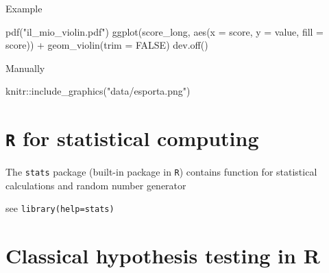 \documentclass[
  ignorenonframetext,
]{beamer}
\newenvironment{Shaded}{\begin{snugshade}}{\end{snugshade}}
\newcommand{\AttributeTok}[1]{\textcolor[rgb]{0.00,0.34,0.68}{#1}}
\newcommand{\ConstantTok}[1]{\textcolor[rgb]{0.67,0.33,0.00}{#1}}
\newcommand{\FunctionTok}[1]{\textcolor[rgb]{0.39,0.29,0.61}{#1}}
\newcommand{\NormalTok}[1]{\textcolor[rgb]{0.12,0.11,0.11}{#1}}
\newcommand{\SpecialCharTok}[1]{\textcolor[rgb]{0.24,0.68,0.91}{#1}}
\newcommand{\StringTok}[1]{\textcolor[rgb]{0.75,0.01,0.01}{#1}}
\begin{document}
\begin{frame}[fragile]{Example}
\protect\hypertarget{example}{}
\begin{Shaded}
\begin{Highlighting}[]
\FunctionTok{pdf}\NormalTok{(}\StringTok{"il\_mio\_violin.pdf"}\NormalTok{)}
\FunctionTok{ggplot}\NormalTok{(score\_long, }
       \FunctionTok{aes}\NormalTok{(}\AttributeTok{x =}\NormalTok{ score, }\AttributeTok{y =}\NormalTok{ value,}
           \AttributeTok{fill =}\NormalTok{ score)) }\SpecialCharTok{+} \FunctionTok{geom\_violin}\NormalTok{(}\AttributeTok{trim =} \ConstantTok{FALSE}\NormalTok{) }
\FunctionTok{dev.off}\NormalTok{()}
\end{Highlighting}
\end{Shaded}
\end{frame}

\begin{frame}[fragile]{Manually}
\protect\hypertarget{manually}{}
\begin{Shaded}
\begin{Highlighting}[]
\NormalTok{knitr}\SpecialCharTok{::}\FunctionTok{include\_graphics}\NormalTok{(}\StringTok{"data/esporta.png"}\NormalTok{)}
\end{Highlighting}
\end{Shaded}
\end{frame}

\hypertarget{r-for-statistical-computing}{%
\section{\texorpdfstring{\texttt{R} for statistical
computing}{R for statistical computing}}\label{r-for-statistical-computing}}

\begin{frame}[fragile]{}
\protect\hypertarget{section-9}{}
The \texttt{stats} package (built-in package in \texttt{R}) contains
function for statistical calculations and random number generator

see \texttt{library(help=stats)}
\end{frame}

\hypertarget{classical-hypothesis-testing-in-r}{%
\section{Classical hypothesis testing in
R}\label{classical-hypothesis-testing-in-r}}
\end{document}
